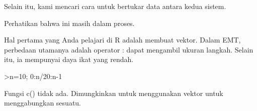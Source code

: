 \documentclass[a4paper,10pt]{article}
\begin{document}
\begin{eulernotebook}
\begin{eulercomment}
\begin{eulercomment}
\begin{eulercomment}
\begin{eulercomment}
\begin{eulercomment}
\begin{eulercomment}
\begin{eulercomment}
Selain itu, kami mencari cara untuk bertukar data antara kedua sistem.
\end{eulercomment}
\begin{eulercomment}
Perhatikan bahwa ini masih dalam proses.
\end{eulercomment}
\begin{eulercomment}
Hal pertama yang Anda pelajari di R adalah membuat vektor. Dalam EMT,
perbedaan utamanya adalah operator : dapat mengambil ukuran langkah.
Selain itu, ia mempunyai daya ikat yang rendah.
\end{eulercomment}
\begin{eulerprompt}
>n=10; 0:n/20:n-1
\end{eulerprompt}
\begin{euleroutput}
  [0,  0.5,  1,  1.5,  2,  2.5,  3,  3.5,  4,  4.5,  5,  5.5,  6,  6.5,
  7,  7.5,  8,  8.5,  9]
\end{euleroutput}
\begin{eulercomment}
Fungsi c() tidak ada. Dimungkinkan untuk menggunakan vektor untuk
menggabungkan sesuatu.


\end{eulercomment}
\end{eulercomment}
\end{eulercomment}
\end{eulercomment}
\end{eulercomment}
\end{eulercomment}
\end{eulercomment}
\end{eulernotebook}
\end{document}
